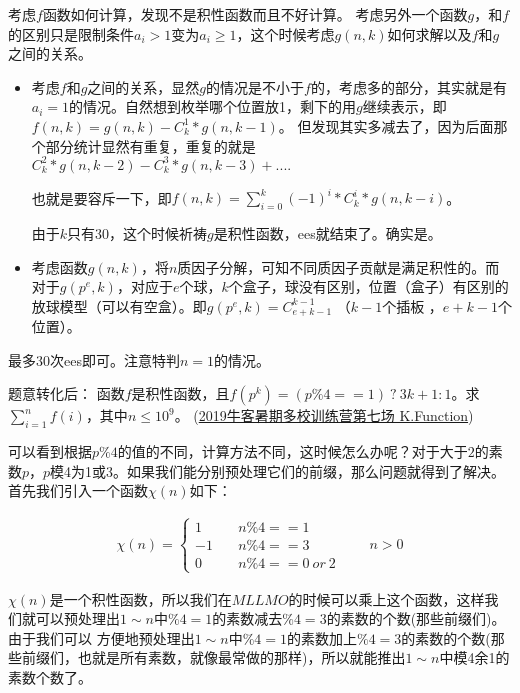 \begin{solution}
	考虑$f$函数如何计算，发现不是积性函数而且不好计算。
	考虑另外一个函数$g$，和$f$的区别只是限制条件$a_i>1$变为$a_i\ge 1$，这个时候考虑$g(n,k)$如何求解以及$f$和$g$之间的关系。
	\begin{itemize}
		\item 考虑$f$和$g$之间的关系，显然$g$的情况是不小于$f$的，考虑多的部分，其实就是有$a_i=1$的情况。自然想到枚举哪个位置放1，剩下的用$g$继续表示，即$f(n,k) = g(n,k) - C_k^1*g(n,k-1)$。 但发现其实多减去了，因为后面那个部分统计显然有重复，重复的就是$C_k^2*g(n,k-2) - C_k^3*g(n,k-3)+....$   
		
		也就是要容斥一下，即$f(n,k) = \sum_{i=0}^k(-1)^i*C_k^i*g(n,k-i)$。  
		
		由于$k$只有30，这个时候祈祷$g$是积性函数，ees就结束了。确实是。
		\item 考虑函数$g(n,k)$，将$n$质因子分解，可知{\heiti 不同质因子贡献是满足积性的}。而对于$g(p^e,k)$，对应于$e$个球，$k$个盒子，球没有区别，位置（盒子）有区别的放球模型（可以有空盒）。即$g(p^e,k) = C_{e+k-1}^{k-1}$  （$k-1$个插板 ，$e+k-1$个位置）。
	\end{itemize}
	
	最多30次ees即可。注意特判$n=1$的情况。
\end{solution}



\vbox{}

\begin{example}
	题意转化后：
	函数$f$是积性函数，且$f(p^k) = (p\%4==1) \ ?\ 3k+1 : 1$。求$\sum_{i=1}^n f(i)$，其中$n\le 10^9$。
	(\href{https://ac.nowcoder.com/acm/contest/887/K}{2019牛客暑期多校训练营第七场 K.Function})
\end{example}

\begin{solution}
可以看到根据$p\%4$的值的不同，计算方法不同，这时候怎么办呢？对于大于$2$的素数$p$，$p$模4为1或3。如果我们能分别预处理它们的前缀，那么问题就得到了解决。
首先我们引入一个函数$\chi(n)$如下：

\begin{align*}
\chi(n) = \left\{\begin{matrix}
1&  \quad  n\%4==1\\
-1  & \quad  n\%4==3 \\
0 &\quad   n\%4==0\ or\ 2
\end{matrix}\right. \quad\quad n>0
\end{align*}

$\chi(n)$是一个积性函数，所以我们在$MLLMO$的时候可以乘上这个函数，这样我们就可以预处理出$1\sim n$中$\%4=1$的素数减去$\%4=3$的素数的个数(那些前缀们)。由于我们可以
方便地预处理出$1\sim n$中$\%4=1$的素数加上$\%4=3$的素数的个数(那些前缀们，也就是所有素数，就像最常做的那样)，所以就能推出$1\sim n$中模4余1的素数个数了。
\end{solution}


